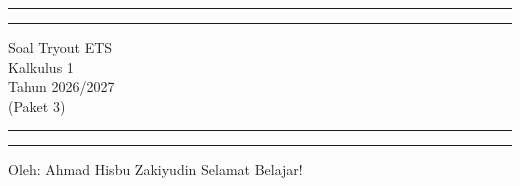\documentclass[10pt,openany,a4paper]{article}
\theoremstyle{definition}
\theoremstyle{definition}
\theoremstyle{plain}
\begin{document}
\begin{titlepage}
	\centering %
	\vspace*{1.5\baselineskip} %

	\rule{13cm}{1.6pt}\vspace*{-\baselineskip}\vspace*{2pt} %
	\rule{13cm}{0.4pt} %
	
		\vspace{0.75\baselineskip} %
	{	\Huge Soal Tryout ETS\\ 
			\vspace{4mm}
		Kalkulus 1 \\ \vspace{2mm} \huge{Tahun 2026/2027}\\ \vspace{2mm} \Large{(Paket 3)}\\	}
		\vspace{0.75\baselineskip} %
	\rule{13cm}{0.4pt}\vspace*{-\baselineskip}\vspace{3.2pt} %
	\rule{13cm}{1.6pt} %
	
		\vspace{1.75\baselineskip} %
{\large Oleh: Ahmad Hisbu Zakiyudin}
	\vfill
	\vspace{1mm}
\huge{Selamat Belajar!}
\end{titlepage}
\makeatletter
\setlength\fboxsep{3pt}
\setlength{\headheight}{24pt}
\end{document}
